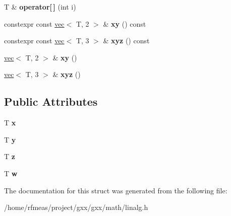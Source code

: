 \begin{DoxyCompactItemize}
\item 
T \& {\bfseries operator\mbox{[}$\,$\mbox{]}} (int i)\hypertarget{structlinalg_1_1vec_3_01T_00_014_01_4_afa39ebd94dd5fcc9dd2193ee5377a507}{}\label{structlinalg_1_1vec_3_01T_00_014_01_4_afa39ebd94dd5fcc9dd2193ee5377a507}

\item 
constexpr const \hyperlink{structlinalg_1_1vec}{vec}$<$ T, 2 $>$ \& {\bfseries xy} () const \hypertarget{structlinalg_1_1vec_3_01T_00_014_01_4_a8ba72bccf0aa0718b951ac7ae768dc00}{}\label{structlinalg_1_1vec_3_01T_00_014_01_4_a8ba72bccf0aa0718b951ac7ae768dc00}

\item 
constexpr const \hyperlink{structlinalg_1_1vec}{vec}$<$ T, 3 $>$ \& {\bfseries xyz} () const \hypertarget{structlinalg_1_1vec_3_01T_00_014_01_4_acc73702caacc73c20f7661322e24b8cd}{}\label{structlinalg_1_1vec_3_01T_00_014_01_4_acc73702caacc73c20f7661322e24b8cd}

\item 
\hyperlink{structlinalg_1_1vec}{vec}$<$ T, 2 $>$ \& {\bfseries xy} ()\hypertarget{structlinalg_1_1vec_3_01T_00_014_01_4_aa90c75117df84d8d908c6469ea8acd1d}{}\label{structlinalg_1_1vec_3_01T_00_014_01_4_aa90c75117df84d8d908c6469ea8acd1d}

\item 
\hyperlink{structlinalg_1_1vec}{vec}$<$ T, 3 $>$ \& {\bfseries xyz} ()\hypertarget{structlinalg_1_1vec_3_01T_00_014_01_4_a62213176416524c9e11ab9a38fa3a43f}{}\label{structlinalg_1_1vec_3_01T_00_014_01_4_a62213176416524c9e11ab9a38fa3a43f}

\end{DoxyCompactItemize}
\subsection*{Public Attributes}
\begin{DoxyCompactItemize}
\item 
T {\bfseries x}\hypertarget{structlinalg_1_1vec_3_01T_00_014_01_4_a8ea77f56892d721c3dd91da3f5929dde}{}\label{structlinalg_1_1vec_3_01T_00_014_01_4_a8ea77f56892d721c3dd91da3f5929dde}

\item 
T {\bfseries y}\hypertarget{structlinalg_1_1vec_3_01T_00_014_01_4_a4ef37cb3c3733e9ced830a5c173ee2ed}{}\label{structlinalg_1_1vec_3_01T_00_014_01_4_a4ef37cb3c3733e9ced830a5c173ee2ed}

\item 
T {\bfseries z}\hypertarget{structlinalg_1_1vec_3_01T_00_014_01_4_a8497b6644e496a346e68d404fe5512e5}{}\label{structlinalg_1_1vec_3_01T_00_014_01_4_a8497b6644e496a346e68d404fe5512e5}

\item 
T {\bfseries w}\hypertarget{structlinalg_1_1vec_3_01T_00_014_01_4_ae52f17412dd29611c842e1a34eac9b92}{}\label{structlinalg_1_1vec_3_01T_00_014_01_4_ae52f17412dd29611c842e1a34eac9b92}

\end{DoxyCompactItemize}


The documentation for this struct was generated from the following file\+:\begin{DoxyCompactItemize}
\item 
/home/rfmeas/project/gxx/gxx/math/linalg.\+h\end{DoxyCompactItemize}
